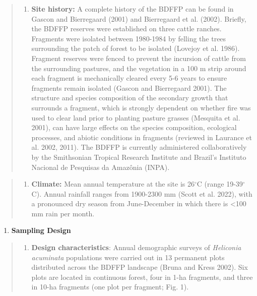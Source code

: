 \documentclass[
  12pt,
  man, donotrepeattitle,floatsintext]{apa6}
\providecommand{\tightlist}{%
  \setlength{\itemsep}{0pt}\setlength{\parskip}{0pt}}
\begin{document}
\begin{quote}
\begin{enumerate}
\def\labelenumi{\alph{enumi}.}
\setcounter{enumi}{5}
\tightlist
\item
  \textbf{Site history:} A complete history of the BDFFP can be found in Gascon and Bierregaard (2001) and Bierregaard et al. (2002). Briefly, the BDFFP reserves were established on three cattle ranches. Fragments were isolated between 1980-1984 by felling the trees surrounding the patch of forest to be isolated (Lovejoy et al. 1986). Fragment reserves were fenced to prevent the incursion of cattle from the surrounding pastures, and the vegetation in a 100 m strip around each fragment is mechanically cleared every 5-6 years to ensure fragments remain isolated (Gascon and Bierregaard 2001). The structure and species composition of the secondary growth that surrounds a fragment, which is strongly dependent on whether fire was used to clear land prior to planting pasture grasses (Mesquita et al. 2001), can have large effects on the species composition, ecological processes, and abiotic conditions in fragments (reviewed in Laurance et al. 2002, 2011). The BDFFP is currently administered collaboratively by the Smithsonian Tropical Research Institute and Brazil's Instituto Nacional de Pesquisas da Amazônia (INPA).
\end{enumerate}
\end{quote}

\begin{quote}
\begin{enumerate}
\def\labelenumi{\alph{enumi}.}
\setcounter{enumi}{6}
\tightlist
\item
  \textbf{Climate:} Mean annual temperature at the site is 26\(^\circ\)C (range 19-39\(^\circ\)C). Annual rainfall ranges from 1900-2300 mm (Scott et al. 2022), with a pronounced dry season from June-December in which there is \textless100 mm rain per month.
\end{enumerate}
\end{quote}

\begin{enumerate}
\def\labelenumi{\arabic{enumi}.}
\setcounter{enumi}{1}
\tightlist
\item
  \textbf{Sampling Design}
\end{enumerate}

\begin{quote}
\begin{enumerate}
\def\labelenumi{\alph{enumi}.}
\tightlist
\item
  \textbf{Design characteristics}: Annual demographic surveys of \emph{Heliconia acuminata} populations were carried out in 13 permanent plots distributed across the BDFFP landscape (Bruna and Kress 2002). Six plots are located in continuous forest, four in 1-ha fragments, and three in 10-ha fragments (one plot per fragment; Fig. 1).
\end{enumerate}
\end{quote}
\end{document}
